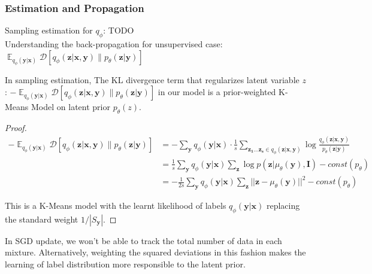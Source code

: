 \documentclass[twoside,11pt]{article}
\DeclareMathOperator{\E}{\mathbb{E}}
\begin{document}
\subsubsection{Estimation and Propagation}

Sampling estimation for $q_\phi$: TODO \\

\noindent Understanding the back-propagation for unsupervised case:
$\E_{q_\phi (\bm{y} | \bm{x})} 
    \mathcal{D} \left[ q_\phi (\bm{z} | \bm{x}, 
    \bm{y}) \parallel p_\theta (\bm{z} | \bm{y}) 
    \right]$

\begin{lemma}
In sampling estimation, The KL divergence term 
that regularizes latent variable $z$: 
$- \E_{q_\phi (\bm{y} | \bm{x})} 
\mathcal{D} \left[ q_\phi (\bm{z} | \bm{x}, 
\bm{y}) \parallel p_\theta (\bm{z} | \bm{y}) 
\right]$ in our model is a prior-weighted 
K-Means Model on latent prior $p_\theta (z)$.
\end{lemma}

\begin{proof}
\begin{equation} \label{pfKmeans}
\begin{split}
- \E_{q_\phi (\bm{y} | \bm{x})} \mathcal{D} \left[ 
q_\phi (\bm{z} | \bm{x}, \bm{y}) \parallel p_\theta 
(\bm{z} | \bm{y}) \right] 
 & = - \sum_{\bm{y}} q_\phi (\bm{y} | \bm{x}) 
    \cdot \frac{1}{s} \sum_{\bm{z_1} \dots \bm{z_s} 
    \in q_\phi (\bm{z} | \bm{x}, \bm{y})} 
    \log \frac{q_\phi (\bm{z} | \bm{x}, \bm{y})}{
    p_\theta (\bm{z} | \bm{y})} \\
 & = \frac{1}{s} \sum_{\bm{y}} q_\phi (\bm{y} | 
    \bm{x}) \sum_{\bm{z}} \log p (\bm{z} | 
    \mu_\theta(\bm{y}), \bm{I}) - 
    \textit{const}(p_\theta) \\
 & = - \frac{1}{2s} \sum_{\bm{y}} q_\phi (\bm{y} | 
    \bm{x}) \sum_{\bm{z}} {|| \bm{z} - 
    \mu_\theta(\bm{y}) ||}^2 - 
    \textit{const}(p_\theta)
\end{split}
\end{equation}

This is a K-Means model with the learnt likelihood of 
labels $q_\phi (\bm{y} | \bm{x})$ replacing the standard 
weight $1 / |S_{\bm{y}}|$.
\end{proof}

In SGD update, we won't be able 
to track the total number of data in each mixture. 
Alternatively, weighting the squared deviations in this 
fashion makes the learning of label distribution more 
responsible to the latent prior. \\
\end{document}
